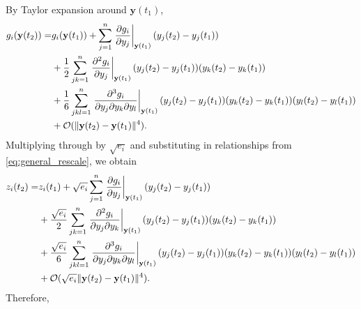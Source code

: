 By Taylor expansion around $\mathbf{y}(t_1)$,
%
\begin{equation}
\begin{aligned}
g_i(\mathbf{y}(t_2)) =& 
g_i(\mathbf{y}(t_1)) + \sum_{j=1}^n \left. \frac{\partial g_i}{\partial y_j} \right|_{\mathbf{y}(t_1)} (y_j(t_2)-y_j(t_1))\\
&+ \frac{1}{2} \sum_{jk=1}^n \left. \frac{\partial^2 g_i}{\partial y_j} \right|_{\mathbf{y}(t_1)} (y_j(t_2)-y_j(t_1)) (y_k(t_2)-y_k(t_1))\\
&+ \frac{1}{6} \sum_{jkl=1}^n \left. \frac{\partial^3 g_i}{\partial y_j \partial y_k \partial y_l} \right|_{\mathbf{y}(t_1)} (y_j(t_2)-y_j(t_1)) (y_k(t_2)-y_k(t_1)) (y_l(t_2)-y_l(t_1)) \\
&+ \mathcal{O}( \|\mathbf{y}(t_2) - \mathbf{y}(t_1) \|^4) .
\end{aligned}
\end{equation}
%
Multiplying through by $\sqrt{e_i}$ and
substituting in relationships from \eqref{eq:general_rescale}, we obtain
%
\begin{equation}
\begin{aligned}
z_i(t_2) =& 
z_i(t_1) + \sqrt{e_i} \sum_{j=1}^n \left. \frac{\partial g_i}{\partial y_j} \right|_{\mathbf{y}(t_1)} (y_j(t_2)-y_j(t_1))\\
&+ \frac{\sqrt{e_i}}{2} \sum_{jk=1}^n \left. \frac{\partial^2 g_i}{\partial y_j \partial y_k} \right|_{\mathbf{y}(t_1)} (y_j(t_2)-y_j(t_1)) (y_k(t_2)-y_k(t_1))\\
&+ \frac{\sqrt{e_i}}{6} \sum_{jkl=1}^n \left. \frac{\partial^3 g_i}{\partial y_j \partial y_k \partial y_l} \right|_{\mathbf{y}(t_1)} (y_j(t_2)-y_j(t_1)) (y_k(t_2)-y_k(t_1)) (y_l(t_2)-y_l(t_1)) \\
&+ \mathcal{O}( \sqrt{e_i} \|\mathbf{y}(t_2) - \mathbf{y}(t_1) \|^4) .
\end{aligned}
\end{equation}
%
Therefore, 
%
